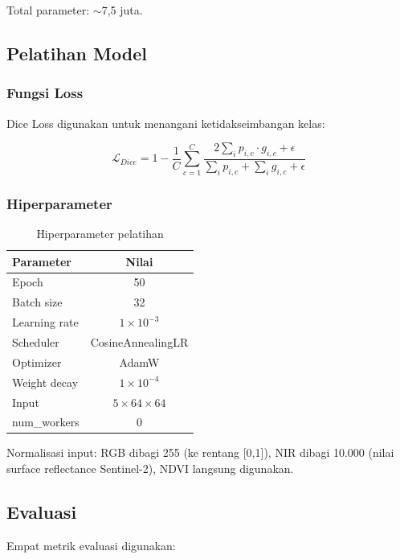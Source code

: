 \documentclass[12pt,a4paper]{article}
\begin{document}
Total parameter: $\sim$7,5 juta.

\subsection{Pelatihan Model}

\subsubsection{Fungsi Loss}

Dice Loss digunakan untuk menangani ketidakseimbangan kelas:

\begin{equation}
    \label{eq:dice}
    \mathcal{L}_{Dice} = 1 - \frac{1}{C} \sum_{c=1}^{C}
    \frac{2 \sum_i p_{i,c} \cdot g_{i,c} + \epsilon}{\sum_i p_{i,c} + \sum_i g_{i,c} + \epsilon}
\end{equation}

\subsubsection{Hiperparameter}

\begin{table}[H]
\centering
\caption{Hiperparameter pelatihan}
\label{tab:hyper}
\begin{tabular}{lc}
\toprule
\textbf{Parameter} & \textbf{Nilai} \\
\midrule
Epoch & 50 \\
Batch size & 32 \\
Learning rate & $1 \times 10^{-3}$ \\
Scheduler & CosineAnnealingLR \\
Optimizer & AdamW \\
Weight decay & $1 \times 10^{-4}$ \\
Input & $5 \times 64 \times 64$ \\
num\_workers & 0 \\
\bottomrule
\end{tabular}
\end{table}

Normalisasi input: RGB dibagi 255 (ke rentang [0,1]), NIR dibagi 10.000
(nilai surface reflectance Sentinel-2), NDVI langsung digunakan.

\subsection{Evaluasi}

Empat metrik evaluasi digunakan:
\end{document}
